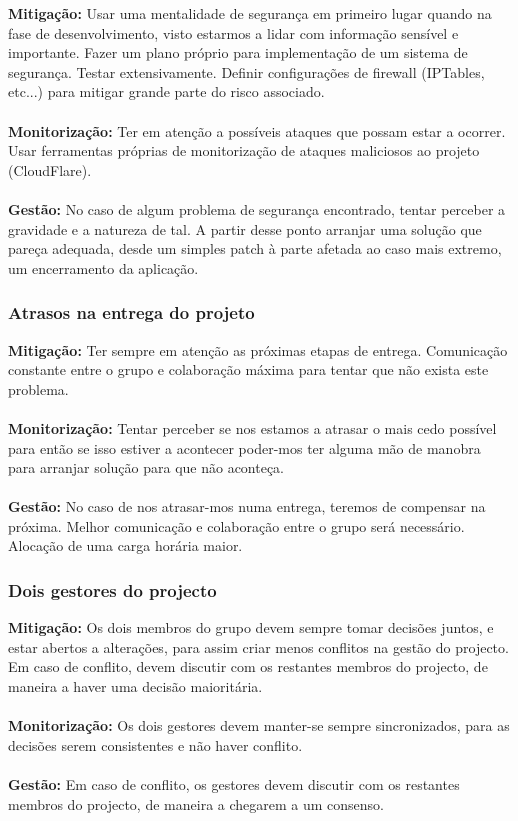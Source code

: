 \documentclass[12pt, a4paper, twoside]{report} %
\begin{document}
\textbf{Mitigação:} Usar uma mentalidade de segurança em primeiro lugar quando na fase de desenvolvimento, visto estarmos a lidar com informação sensível e importante. Fazer um plano próprio para implementação de um sistema de segurança. Testar extensivamente.
Definir configurações de firewall (IPTables, etc...) para mitigar grande parte do risco associado.\\
\\
\textbf{Monitorização:} Ter em atenção a possíveis ataques que possam estar a ocorrer. Usar ferramentas próprias de monitorização de ataques maliciosos ao projeto (CloudFlare).\\
\\
\textbf{Gestão:} No caso de algum problema de segurança encontrado, tentar perceber a gravidade e a natureza de tal. A partir desse ponto arranjar uma solução que pareça adequada, desde um simples patch à parte afetada ao caso mais extremo, um encerramento da aplicação.


\subsubsection{Atrasos na entrega do projeto}


\textbf{Mitigação:} Ter sempre em atenção as próximas etapas de entrega. Comunicação constante entre o grupo e colaboração máxima para tentar que não exista este problema.\\
\\
\textbf{Monitorização:} Tentar perceber se nos estamos a atrasar o mais cedo possível para então se isso estiver a acontecer poder-mos ter alguma mão de manobra para arranjar solução para que não aconteça.\\
\\
\textbf{Gestão:} No caso de nos atrasar-mos numa entrega, teremos de compensar na próxima. Melhor comunicação e colaboração entre o grupo será necessário. Alocação de uma carga horária maior.


\subsubsection{Dois gestores do projecto}


\textbf{Mitigação:} Os dois membros do grupo devem sempre tomar decisões juntos, e estar abertos a alterações, para assim criar menos conflitos na gestão do projecto. Em caso de conflito, devem discutir com os restantes membros do projecto, de maneira a haver uma decisão maioritária.\\
\\
\textbf{Monitorização:} Os dois gestores devem manter-se sempre sincronizados, para as decisões serem consistentes e não haver conflito.\\
\\
\textbf{Gestão:} Em caso de conflito, os gestores devem discutir com os restantes membros do projecto, de maneira a chegarem a um consenso.
\end{document}
